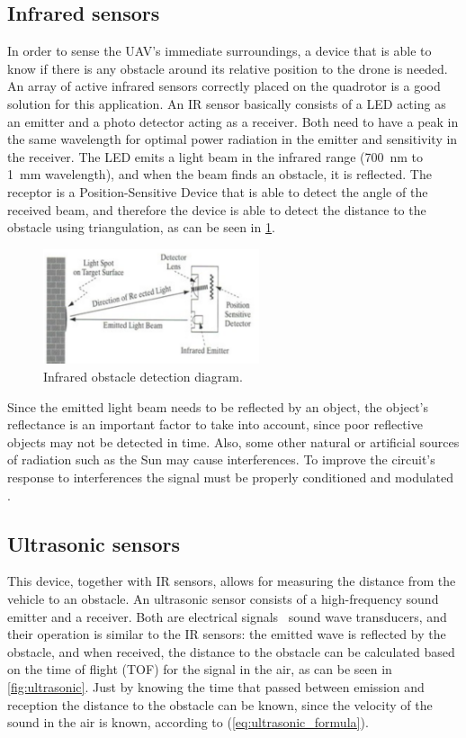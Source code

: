 \documentclass[journal]{IEEEtran}
\begin{document}
	\subsection{Infrared sensors}
	In order to sense the UAV's immediate surroundings, a device that is able to know if there is any obstacle around its relative position to the drone is needed. An array of active infrared sensors correctly placed on the quadrotor is a good solution for this application. An IR sensor basically consists of a LED acting as an emitter and a photo detector acting as a receiver. Both need to have a peak in the same wavelength for optimal power radiation in the emitter and sensitivity in the receiver. The LED emits a light beam in the infrared range (\SI{700}{\nano \meter} to \SI{1}{\milli \meter} wavelength), and when the beam finds an obstacle, it is reflected. The receptor is a Position-Sensitive Device that is able to detect the angle of the received beam, and therefore the device is able to detect the distance to the obstacle using triangulation, as can be seen in \figurename{ \ref{fig:ir}}.
	\begin{figure}[H]
		\centering
		\includegraphics[width=2.5in]{ir}
		\caption{Infrared obstacle detection diagram.}
		\label{fig:ir}
	\end{figure}
	Since the emitted light beam needs to be reflected by an object, the object's reflectance is an important factor to take into account, since poor reflective objects may not be detected in time.  Also, some other natural or artificial sources of radiation such as the Sun may cause interferences. To improve the circuit's response to interferences the signal must be properly conditioned and modulated \cite{mod_control_bresciani, remotecontrol}.
	
	\subsection{Ultrasonic sensors}
	This device, together with IR sensors, allows for measuring the distance from the vehicle to an obstacle. An ultrasonic sensor consists of a high-frequency sound emitter and a receiver. Both are electrical signals \textendash \ sound wave transducers, and their operation is similar to the IR sensors: the emitted wave is reflected by the obstacle, and when received, the distance to the obstacle can be calculated based on the time of flight (TOF) for the signal in the air, as can be seen in \figurename{} \ref{fig:ultrasonic}. Just by knowing the time that passed between emission and reception the distance to the obstacle can be known, since the velocity of the sound in the air is known, according to (\ref{eq:ultrasonic_formula}). 
	
\end{document}
